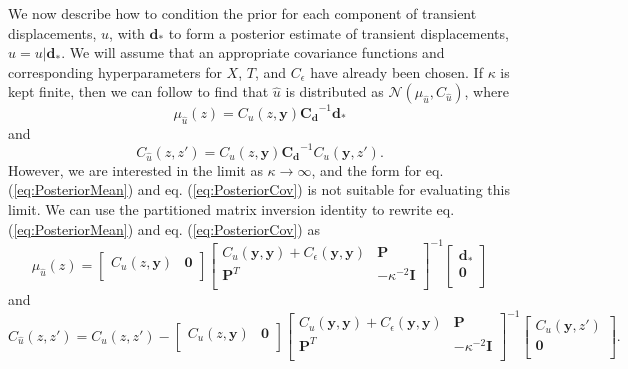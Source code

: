 \documentclass[10pt,a4paper]{article}
\begin{document}
We now describe how to condition the prior for each component of transient displacements, $u$, with $\bm{d}_*$ to form a posterior estimate of transient displacements, $\hat{u} = u | \bm{d}_*$. We will assume that an appropriate covariance functions and corresponding hyperparameters for $X$, $T$, and $C_\epsilon$ have already been chosen. If $\kappa$ is kept finite, then we can follow \citet{Rasmussen2006} to find that $\hat{u}$ is distributed as $\mathcal{N}(\mu_{\hat{u}},C_{\hat{u}})$, where
\begin{equation}\label{eq:PosteriorMean}
\mu_{\hat{u}}(z) = C_u(z,\bm{y})\bm{C_d}^{-1}\bm{d}_*
\end{equation}    
and
\begin{equation}\label{eq:PosteriorCov}
C_{\hat{u}}(z,z') = C_u(z,\bm{y})\bm{C_d}^{-1}C_u(\bm{y},z').
\end{equation}
However, we are interested in the limit as $\kappa \to \infty$, and the form for eq. (\ref{eq:PosteriorMean}) and eq. (\ref{eq:PosteriorCov}) is not suitable for evaluating this limit. We can use the partitioned matrix inversion identity \citep[e.g.,][]{Press2007} to rewrite eq. (\ref{eq:PosteriorMean}) and eq. (\ref{eq:PosteriorCov}) as
 \begin{equation}\label{eq:PosteriorMean2}
\mu_{\hat{u}}(z) =
\left[ 
\begin{array}{cc}
C_u(z,\bm{y}) & \bm{0} \\
\end{array}
\right]
\left[
\begin{array}{cc}
C_u(\bm{y},\bm{y}) + C_\epsilon(\bm{y},\bm{y}) & \bm{P} \\
\bm{P}^T  & -\kappa^{-2} \bm{I} \\
\end{array}
\right]^{-1}
\left[
\begin{array}{c}
\bm{d}_* \\
\bm{0} \\
\end{array}
\right]
\end{equation}    
and
\begin{equation}\label{eq:PosteriorCov2}
C_{\hat{u}}(z,z') = 
C_u(z,z') - 
\left[ 
\begin{array}{cc}
C_u(z,\bm{y}) & \bm{0} \\
\end{array}
\right]
\left[
\begin{array}{cc}
C_u(\bm{y},\bm{y}) + C_\epsilon(\bm{y},\bm{y}) & \bm{P} \\
\bm{P}^T  & -\kappa^{-2} \bm{I} \\
\end{array}
\right]^{-1}
\left[
\begin{array}{c}
C_u(\bm{y},z') \\
\bm{0} \\
\end{array}
\right].
\end{equation}
\end{document}

